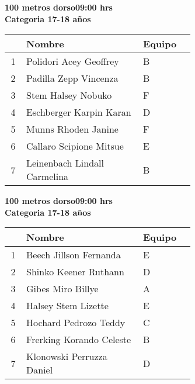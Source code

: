 \begin{minipage}{0.95\linewidth}\vspace{0.5cm} 
\begin{flushleft}
\textbf{
\hspace{-0.15cm}100 metros dorso\hspace{1.5cm}09:00 hrs \\Categoria 17-18 años}\vspace{-0.2cm} 
\end{flushleft}
\begin{tabular}{cp{0.63\linewidth}l}
\hline
& \textbf{Nombre} & \textbf{Equipo} \\ \hline
1 & Polidori Acey Geoffrey & B \\ 
2 & Padilla Zepp Vincenza & B \\ 
3 & Stem Halsey Nobuko & F \\ 
4 & Eschberger Karpin Karan & D \\ 
5 & Munns Rhoden Janine & F \\ 
6 & Callaro Scipione Mitsue & E \\ 
7 & Leinenbach Lindall Carmelina & B \\ 
\end{tabular}
\end{minipage}
\begin{minipage}{0.95\linewidth}\vspace{0.5cm} 
\begin{flushleft}
\textbf{
\hspace{-0.15cm}100 metros dorso\hspace{1.5cm}09:00 hrs \\Categoria 17-18 años}\vspace{-0.2cm} 
\end{flushleft}
\begin{tabular}{cp{0.63\linewidth}l}
\hline
& \textbf{Nombre} & \textbf{Equipo} \\ \hline
1 & Beech Jillson Fernanda & E \\ 
2 & Shinko Keener Ruthann & D \\ 
3 & Gibes Miro Billye & A \\ 
4 & Halsey Stem Lizette & E \\ 
5 & Hochard Pedrozo Teddy & C \\ 
6 & Frerking Korando Celeste & B \\ 
7 & Klonowski Perruzza Daniel & D \\ 
\end{tabular}
\end{minipage}
